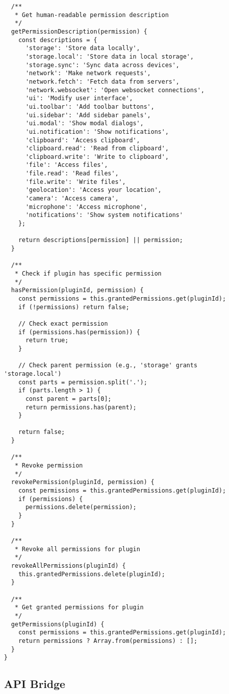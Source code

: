 \documentclass[11pt]{article}
\begin{document}
\begin{verbatim}
  /**
   * Get human-readable permission description
   */
  getPermissionDescription(permission) {
    const descriptions = {
      'storage': 'Store data locally',
      'storage.local': 'Store data in local storage',
      'storage.sync': 'Sync data across devices',
      'network': 'Make network requests',
      'network.fetch': 'Fetch data from servers',
      'network.websocket': 'Open websocket connections',
      'ui': 'Modify user interface',
      'ui.toolbar': 'Add toolbar buttons',
      'ui.sidebar': 'Add sidebar panels',
      'ui.modal': 'Show modal dialogs',
      'ui.notification': 'Show notifications',
      'clipboard': 'Access clipboard',
      'clipboard.read': 'Read from clipboard',
      'clipboard.write': 'Write to clipboard',
      'file': 'Access files',
      'file.read': 'Read files',
      'file.write': 'Write files',
      'geolocation': 'Access your location',
      'camera': 'Access camera',
      'microphone': 'Access microphone',
      'notifications': 'Show system notifications'
    };
    
    return descriptions[permission] || permission;
  }
  
  /**
   * Check if plugin has specific permission
   */
  hasPermission(pluginId, permission) {
    const permissions = this.grantedPermissions.get(pluginId);
    if (!permissions) return false;
    
    // Check exact permission
    if (permissions.has(permission)) {
      return true;
    }
    
    // Check parent permission (e.g., 'storage' grants 'storage.local')
    const parts = permission.split('.');
    if (parts.length > 1) {
      const parent = parts[0];
      return permissions.has(parent);
    }
    
    return false;
  }
  
  /**
   * Revoke permission
   */
  revokePermission(pluginId, permission) {
    const permissions = this.grantedPermissions.get(pluginId);
    if (permissions) {
      permissions.delete(permission);
    }
  }
  
  /**
   * Revoke all permissions for plugin
   */
  revokeAllPermissions(pluginId) {
    this.grantedPermissions.delete(pluginId);
  }
  
  /**
   * Get granted permissions for plugin
   */
  getPermissions(pluginId) {
    const permissions = this.grantedPermissions.get(pluginId);
    return permissions ? Array.from(permissions) : [];
  }
}
\end{verbatim}
\subsection{API Bridge}
\label{sec:org12d6261}
\end{document}
